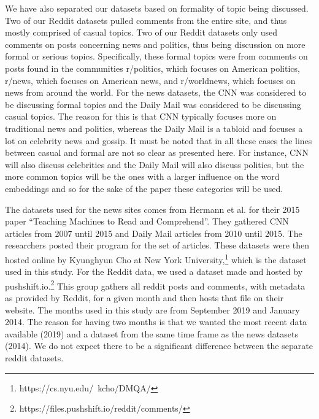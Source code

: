 \documentclass[10pt,letterpaper]{article}
\begin{document}
We have also separated our datasets based on formality of topic being discussed. Two of our Reddit datasets pulled comments from the entire site, and thus mostly comprised of casual topics. Two of our Reddit datasets only used comments on posts concerning news and politics, thus being discussion on more formal or serious topics. Specifically, these formal topics were from comments on posts found in the communities r/politics, which focuses on American politics, r/news, which focuses on American news, and r/worldnews, which focuses on news from around the world. For the news datasets, the CNN was considered to be discussing formal topics and the Daily Mail was considered to be discussing casual topics. The reason for this is that CNN typically focuses more on traditional news and politics, whereas the Daily Mail is a tabloid and focuses a lot on celebrity news and gossip. It must be noted that in all these cases the lines between casual and formal are not so clear as presented here. For instance, CNN will also discuss celebrities and the Daily Mail will also discuss politics, but the more common topics will be the ones with a larger influence on the word embeddings and so for the sake of the paper these categories will be used.
	
The datasets used for the news sites comes from Hermann et al. for their 2015 paper “Teaching Machines to Read and Comprehend”. They gathered CNN articles from 2007 until 2015 and Daily Mail articles from 2010 until 2015. The researchers posted their program for the set of articles. These datasets were then hosted online by Kyunghyun Cho at New York University,\footnote{https://cs.nyu.edu/~kcho/DMQA/} which is the dataset used in this study. For the Reddit data, we used a dataset made and hosted by pushshift.io.\footnote{https://files.pushshift.io/reddit/comments/} This group gathers all reddit posts and comments, with metadata as provided by Reddit, for a given month and then hosts that file on their website. The months used in this study are from September 2019 and January 2014. The reason for having two months is that we wanted the most recent data available (2019) and a dataset from the same time frame as the news datasets (2014). We do not expect there to be a significant difference between the separate reddit datasets.
	
\end{document}
